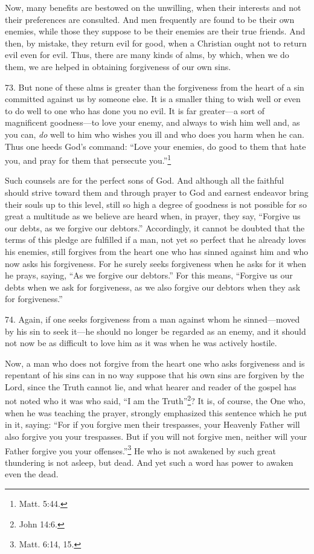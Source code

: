 Now, many benefits are bestowed on the unwilling, when their interests and not their preferences are consulted. And men frequently are found to be their own enemies, while those they suppose to be their enemies are their true friends. And then, by mistake, they return evil for good, when a Christian ought not to return evil even for evil. Thus, there are many kinds of alms, by which, when we do them, we are helped in obtaining forgiveness of our own sins.

73. But none of these alms is greater than the forgiveness from the heart of a sin committed against us by someone else. It is a smaller thing to wish well or even to do well to one who has done you no evil. It is far greater—a sort of magnificent goodness—to love your enemy, and always to wish him well and, as you can, \emph{do} well to him who wishes you ill and who does you harm when he can. Thus one heeds God's command: ``Love your enemies, do good to them that hate you, and pray for them that persecute you.''\footnote{Matt. 5:44.}

Such counsels are for the perfect sons of God. And although all the faithful should strive toward them and through prayer to God and earnest endeavor bring their souls up to this level, still so high a degree of goodness is not possible for so great a multitude as we believe are heard when, in prayer, they say, ``Forgive us our debts, as we forgive our debtors.'' Accordingly, it cannot be doubted that the terms of this pledge are fulfilled if a man, not yet so perfect that he already loves his enemies, still forgives from the heart one who has sinned against him and who now asks his forgiveness. For he surely seeks forgiveness when he asks for it when he prays, saying, ``As we forgive our debtors.'' For this means, ``Forgive us our debts when we ask for forgiveness, as we also forgive our debtors when they ask for forgiveness.''

74. Again, if one seeks forgiveness from a man against whom he sinned—moved by his sin to seek it—he should no longer be regarded as an enemy, and it should not now be as difficult to love him as it was when he was actively hostile.

Now, a man who does not forgive from the heart one who asks forgiveness and is repentant of his sins can in no way suppose that his own sins are forgiven by the Lord, since the Truth cannot lie, and what hearer and reader of the gospel has not noted who it was who said, ``I am the Truth''\footnote{John 14:6.}? It is, of course, the One who, when he was teaching the prayer, strongly emphasized this sentence which he put in it, saying: ``For if you forgive men their trespasses, your Heavenly Father will also forgive you your trespasses. But if you will not forgive men, neither will your Father forgive you your offenses.''\footnote{Matt. 6:14, 15.} He who is not awakened by such great thundering is not asleep, but dead. And yet such a word has power to awaken even the dead.

